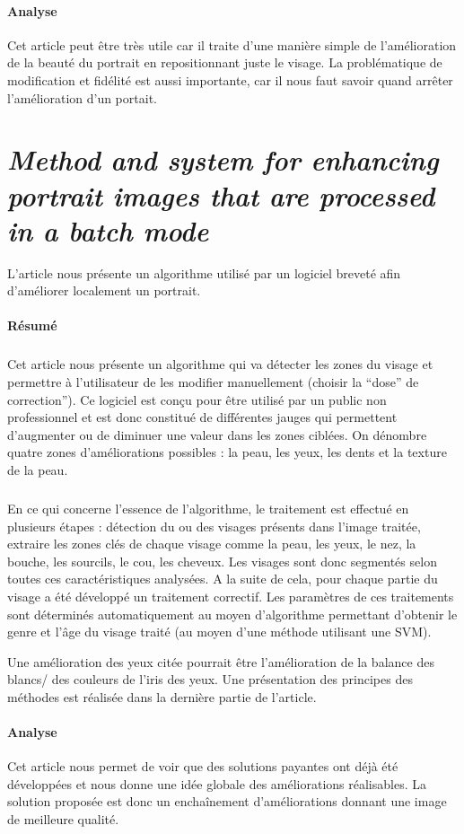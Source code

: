 \documentclass[11pt, french]{report-rd-info}
\begin{document}
\paragraph{Analyse}
Cet article peut être très utile car il traite d'une manière simple de l'amélioration de la beauté du portrait en repositionnant juste le visage. La problématique de modification et fidélité est aussi importante, car il nous faut savoir quand arrêter l'amélioration d'un portait.


\section{\emph{Method and system for enhancing portrait images that are processed in a batch mode}}
L'article \cite{Matraszek2004} nous présente un algorithme utilisé par un logiciel breveté afin d'améliorer localement un portrait.

\paragraph{Résumé}
\subparagraph{}
Cet article nous présente un algorithme qui va détecter les zones du visage et permettre à l'utilisateur de les modifier manuellement (choisir la “dose” de correction”). Ce logiciel est conçu pour être utilisé par un public non professionnel et est donc constitué de différentes jauges qui permettent d'augmenter ou de diminuer une valeur dans les zones ciblées. On dénombre quatre zones d'améliorations possibles : la peau, les yeux, les dents et la texture de la peau.
\subparagraph{}
En ce qui concerne l’essence de l’algorithme, le traitement est effectué en plusieurs étapes : détection du ou des visages présents dans l’image traitée, extraire les zones clés de chaque visage comme la peau, les yeux, le nez, la bouche, les sourcils, le cou, les cheveux. Les visages sont donc segmentés selon toutes ces caractéristiques analysées. A la suite de cela, pour chaque partie du visage a été développé un traitement correctif. Les paramètres de ces traitements sont déterminés automatiquement au moyen d’algorithme permettant d’obtenir le genre et l’âge du visage traité (au moyen d’une méthode utilisant une SVM).

Une amélioration des yeux citée pourrait être l’amélioration de la balance des blancs/ des couleurs de l’iris des yeux. Une présentation des principes des méthodes est réalisée dans la dernière partie de l’article.

\paragraph{Analyse}
Cet article nous permet de voir que des solutions payantes ont déjà été développées et nous donne une idée globale des améliorations réalisables. La solution proposée est donc un enchaînement d’améliorations donnant une image de meilleure qualité. 
\end{document}
